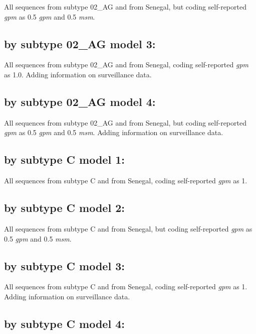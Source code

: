 \documentclass[12pt,]{article}
\begin{document}
All sequences from subtype 02\_AG and from Senegal, but coding
self-reported \emph{gpm} as 0.5 \emph{gpm} and 0.5 \emph{msm}.

\hypertarget{by-subtype-02_ag-model-3}{%
\subsection{by subtype 02\_AG model 3:}\label{by-subtype-02_ag-model-3}}

All sequences from subtype 02\_AG and from Senegal, coding self-reported
\emph{gpm} as 1.0. Adding information on surveillance data.

\hypertarget{by-subtype-02_ag-model-4}{%
\subsection{by subtype 02\_AG model 4:}\label{by-subtype-02_ag-model-4}}

All sequences from subtype 02\_AG and from Senegal, but coding
self-reported \emph{gpm} as 0.5 \emph{gpm} and 0.5 \emph{msm}. Adding
information on surveillance data.

\hypertarget{by-subtype-c-model-1}{%
\subsection{by subtype C model 1:}\label{by-subtype-c-model-1}}

All sequences from subtype C and from Senegal, coding self-reported
\emph{gpm} as 1.

\hypertarget{by-subtype-c-model-2}{%
\subsection{by subtype C model 2:}\label{by-subtype-c-model-2}}

All sequences from subtype C and from Senegal, but coding self-reported
\emph{gpm} as 0.5 \emph{gpm} and 0.5 \emph{msm}.

\hypertarget{by-subtype-c-model-3}{%
\subsection{by subtype C model 3:}\label{by-subtype-c-model-3}}

All sequences from subtype C and from Senegal, coding self-reported
\emph{gpm} as 1. Adding information on surveillance data.

\hypertarget{by-subtype-c-model-4}{%
\subsection{by subtype C model 4:}\label{by-subtype-c-model-4}}
\end{document}
